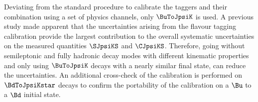Deviating from the standard procedure to calibrate the \OS taggers and their
combination using a set of physics channels, only $\BuToJpsiK$ is used. A
previous study \cite{Aaij:1497268} made apparent that the uncertainties arising
from the flavour tagging calibration provide the largest contribution to the
overall systematic uncertainties on the measured quantities $\SJpsiKS$ and
$\CJpsiKS$. Therefore, going without semileptonic and fully hadronic decay modes
with different kinematic properties and only using $\BuToJpsiK$ decays with a
nearly similar final state, can reduce the uncertainties. An additional
cross-check of the calibration is performed on $\BdToJpsiKstar$ decays to
confirm the portability of the calibration on a $\Bu$ to a $\Bd$ initial state.

